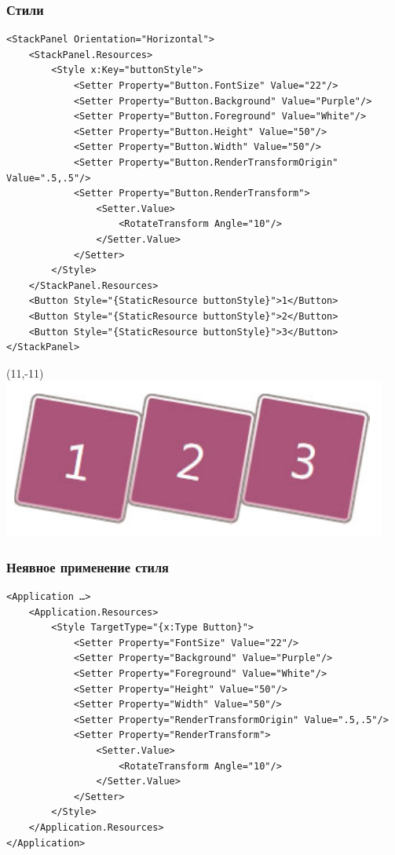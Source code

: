 \documentclass[xetex,mathserif,serif]{beamer}
\begin{document}
	\begin{frame}[fragile]
		\frametitle{Стили}
		\begin{scriptsize}
			\begin{verbatim}
<StackPanel Orientation="Horizontal">
    <StackPanel.Resources>
        <Style x:Key="buttonStyle">
            <Setter Property="Button.FontSize" Value="22"/>
            <Setter Property="Button.Background" Value="Purple"/>
            <Setter Property="Button.Foreground" Value="White"/>
            <Setter Property="Button.Height" Value="50"/>
            <Setter Property="Button.Width" Value="50"/>
            <Setter Property="Button.RenderTransformOrigin" Value=".5,.5"/>
            <Setter Property="Button.RenderTransform">
                <Setter.Value>
                    <RotateTransform Angle="10"/>
                </Setter.Value>
            </Setter>
        </Style>
    </StackPanel.Resources>
    <Button Style="{StaticResource buttonStyle}">1</Button>
    <Button Style="{StaticResource buttonStyle}">2</Button>
    <Button Style="{StaticResource buttonStyle}">3</Button>
</StackPanel> 
			\end{verbatim}
		\end{scriptsize}
		\begin{textblock}{3}(11,-11)
			\includegraphics[width=\textwidth]{buttons.png}
		\end{textblock}
	\end{frame}

	\begin{frame}[fragile]
		\frametitle{Неявное применение стиля}
		\begin{scriptsize}
			\begin{verbatim}
<Application …>
    <Application.Resources>
        <Style TargetType="{x:Type Button}">
            <Setter Property="FontSize" Value="22"/>
            <Setter Property="Background" Value="Purple"/>
            <Setter Property="Foreground" Value="White"/>
            <Setter Property="Height" Value="50"/>
            <Setter Property="Width" Value="50"/>
            <Setter Property="RenderTransformOrigin" Value=".5,.5"/>
            <Setter Property="RenderTransform">
                <Setter.Value>
                    <RotateTransform Angle="10"/>
                </Setter.Value>
            </Setter>
        </Style>
    </Application.Resources>
</Application>
			\end{verbatim}
		\end{scriptsize}
	\end{frame}
\end{document}
